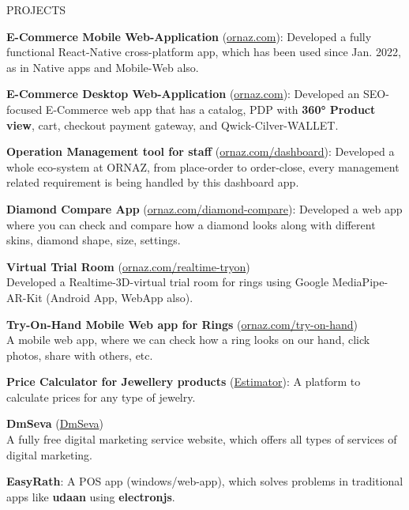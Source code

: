 \documentclass{resume} %
\begin{document}
\begin{rSection}{PROJECTS}
	\vspace{-1.25em}
	\item \textbf{E-Commerce Mobile Web-Application} (\href{https://ornaz.com}{ornaz.com}): Developed a fully functional React-Native cross-platform app, which has been used since Jan. 2022, as in Native apps and Mobile-Web also.
		
	\item \textbf{E-Commerce Desktop Web-Application} (\href{https://ornaz.com}{ornaz.com}):
	Developed an SEO-focused E-Commerce web app that has a catalog, PDP with \textbf{360° Product view}, cart, checkout payment gateway, and Qwick-Cilver-WALLET.
		
	\item \textbf{Operation Management tool for staff} (\href{https://ornaz.com/dashboard}{ornaz.com/dashboard}):
	Developed a whole eco-system at ORNAZ, from place-order to order-close, every management related requirement is being handled by this dashboard app.
		
	\item \textbf{Diamond Compare App} (\href{https://ornaz.com/diamond-compare}{ornaz.com/diamond-compare}):
	Developed a web app where you can check and compare how a diamond looks along with different skins, diamond shape, size, settings.
		
	\item \textbf{Virtual Trial Room} (\href{https://ornaz.com/realtime-tryon}{ornaz.com/realtime-tryon})\\
	Developed a Realtime-3D-virtual trial room for rings using Google MediaPipe-AR-Kit (Android App, WebApp also).
		
	\item \textbf{Try-On-Hand Mobile Web app for Rings} (\href{https://ornaz.com/try-on-hand}{ornaz.com/try-on-hand})\\
	A mobile web app, where we can check how a ring looks on our hand, click photos, share with others, etc.
		
	\item \textbf{Price Calculator for Jewellery products} (\href{https://www.ornaz.com/dashboard/estimation/}{Estimator}):
	A platform to calculate prices for any type of jewelry.
		
	\item \textbf{DmSeva} (\href{https://dmseva.co.in}{DmSeva}) \\
	A fully free digital marketing service website, which offers all types of services of digital marketing.
	
	\item \textbf{EasyRath}:
	A POS app (windows/web-app), which solves problems in traditional apps like \textbf{udaan} using \textbf{electronjs}.
		
\end{rSection} 
\end{document}
